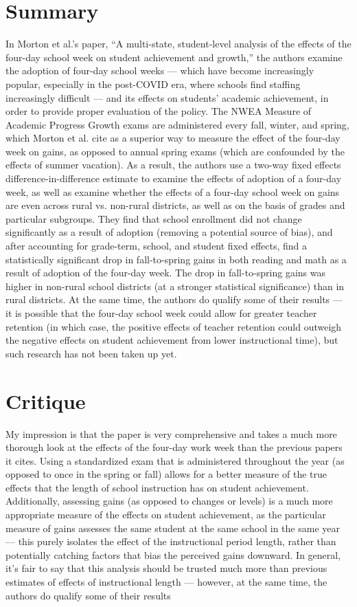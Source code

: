 \documentclass[10pt]{extarticle}
\title{}
\author{}
\date{}
\begin{document}
  \section{Summary}%
  In Morton et al.'s paper, ``A multi-state, student-level analysis of the effects of the four-day school week on student achievement and growth,'' the authors examine the adoption of four-day school weeks --- which have become increasingly popular, especially in the post-COVID era, where schools find staffing increasingly difficult --- and its effects on students' academic achievement, in order to provide proper evaluation of the policy. The NWEA Measure of Academic Progress Growth exams are administered every fall, winter, and spring, which Morton et al. cite as a superior way to measure the effect of the four-day week on gains, as opposed to annual spring exams (which are confounded by the effects of summer vacation). As a result, the authors use a two-way fixed effects difference-in-difference estimate to examine the effects of adoption of a four-day week, as well as examine whether the effects of a four-day school week on gains are even across rural vs. non-rural districts, as well as on the basis of grades and particular subgroups. They find that school enrollment did not change significantly as a result of adoption (removing a potential source of bias), and after accounting for grade-term, school, and student fixed effects, find a statistically significant drop in fall-to-spring gains in both reading and math as a result of adoption of the four-day week. The drop in fall-to-spring gains was higher in non-rural school districts (at a stronger statistical significance) than in rural districts. At the same time, the authors do qualify some of their results --- it is possible that the four-day school week could allow for greater teacher retention (in which case, the positive effects of teacher retention could outweigh the negative effects on student achievement from lower instructional time), but such research has not been taken up yet.
  \section{Critique}%
  My impression is that the paper is very comprehensive and takes a much more thorough look at the effects of the four-day work week than the previous papers it cites. Using a standardized exam that is administered throughout the year (as opposed to once in the spring or fall) allows for a better measure of the true effects that the length of school instruction has on student achievement. Additionally, assessing gains (as opposed to changes or levels) is a much more appropriate measure of the effects on student achievement, as the particular measure of gains assesses the same student at the same school in the same year --- this purely isolates the effect of the instructional period length, rather than potentially catching factors that bias the perceived gains downward. In general, it's fair to say that this analysis should be trusted much more than previous estimates of effects of instructional length --- however, at the same time, the authors do qualify some of their results
\end{document}

